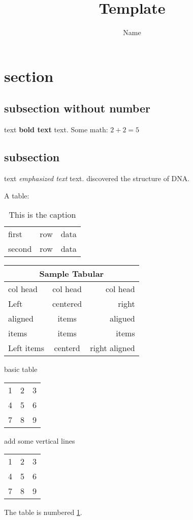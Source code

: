 \documentclass[11pt]{article}
\title{Template}
\author{Name}
\begin{document}
\maketitle

\section{section}
\subsection*{subsection without number}
text \textbf{bold text} text. Some math: $2+2=5$
\subsection{subsection}
text \emph{emphasized text} text. \cite{WC:1953}
discovered the structure of DNA.

A table:
\begin{table}[!th]
\begin{tabular}{|l|c|r|}
\hline
	first  &  row  &  data \\
	second &  row  &  data \\
\hline
\end{tabular}

\caption{This is the caption}
\label{ex:table}
\end{table}

\begin{tabular}{|l|c|r|} \hline
\multicolumn{3}{|c|}{Sample Tabular}   \\
\hline
col head    & col head & col head      \\ \hline
Left        & centered & right         \\ \cline{1-2}
aligned     & items    & aligued       \\ \cline{2-3}
items       & items    & items         \\ \cline{1-2}
Left items  & centerd  & right aligned \\
\hline
\end{tabular}

basic table
\begin{tabular}{ l c r }
    1 & 2 & 3 \\
    4 & 5 & 6 \\
    7 & 8 & 9 \\
\end{tabular}

add some vertical lines
\begin{tabular}{ l | c || r }
    1 & 2 & 3 \\
    4 & 5 & 6 \\
    7 & 8 & 9 \\
\end{tabular}



The table is numbered \ref{ex:table}.
\end{document}
